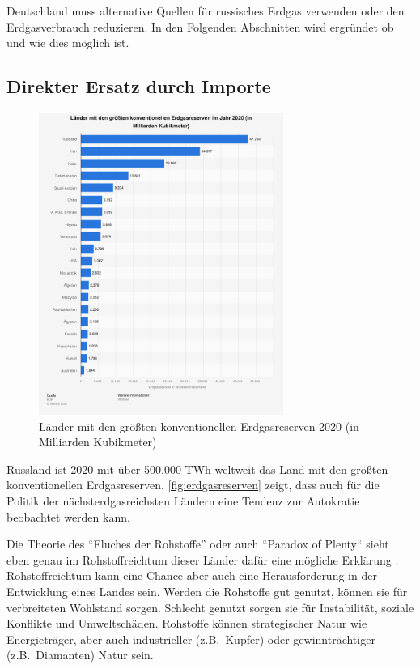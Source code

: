 Deutschland muss alternative Quellen für russisches Erdgas verwenden oder den Erdgasverbrauch reduzieren. In den Folgenden Abschnitten wird ergründet ob und wie dies möglich ist.

\subsection{Direkter Ersatz durch Importe}

\begin{figure}[h]
\centering
\includegraphics[width=8cm]{../fig/erdgasreserven.png}
\caption{Länder mit den größten konventionellen Erdgasreserven 2020 (in Milliarden Kubikmeter) \cite{statista-erdgasreserven}}
\label{fig:erdgasreserven}
\end{figure}

Russland ist 2020 mit über 500.000 TWh weltweit das Land mit den größten konventionellen Erdgasreserven. \autoref{fig:erdgasreserven} zeigt, dass auch für die Politik der nächsterdgasreichsten Ländern eine Tendenz zur Autokratie beobachtet werden kann. 

Die Theorie des ``Fluches der Rohstoffe'' oder auch ``Paradox of Plenty`` sieht eben genau im Rohstoffreichtum dieser Länder dafür eine mögliche Erklärung \cite{gabler}. Rohstoffreichtum kann eine Chance aber auch eine Herausforderung in der Entwicklung eines Landes sein. Werden die Rohstoffe gut genutzt, können sie für verbreiteten Wohlstand sorgen. Schlecht genutzt sorgen sie für Instabilität, soziale Konflikte und Umweltschäden. 
Rohstoffe können strategischer Natur wie Energieträger, aber auch industrieller (z.B.~Kupfer) oder gewinnträchtiger (z.B.~Diamanten) Natur sein.

